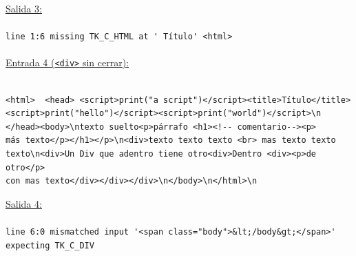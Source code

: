 \underline{Salida 3:}
\\\\
\verb|line 1:6 missing TK_C_HTML at ' Título' <html>|\\\\
\underline{Entrada 4 (\texttt{<div>} sin cerrar):}
\\\\
\begin{verbatim}
<html>  <head> <script>print("a script")</script><title>Título</title>
<script>print("hello")</script><script>print("world")</script>\n
</head><body>\ntexto suelto<p>párrafo <h1><!-- comentario--><p> 
más texto</p></h1></p>\n<div>texto texto texto <br> mas texto texto 
texto\n<div>Un Div que adentro tiene otro<div>Dentro <div><p>de otro</p> 
con mas texto</div></div></div>\n</body>\n</html>\n
\end{verbatim}

\underline{Salida 4:}\\\\
{\footnotesize
\verb|line 6:0 mismatched input '<span class="body">&lt;/body&gt;</span>' expecting TK_C_DIV|
}
